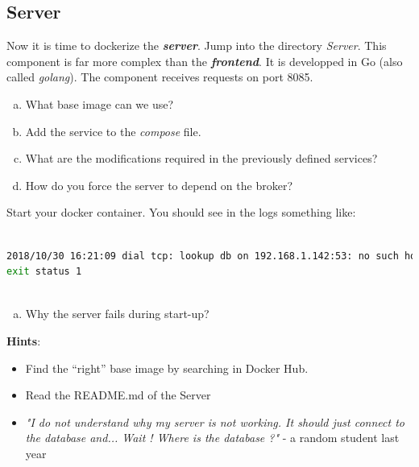 \documentclass[a4paper,11pt]{exam}
\begin{document}
\subsection{Server}
	\begin{questions}

	\question Now it is time to dockerize the \textit{\textbf{server}}. Jump into the directory \textit{Server}. This component is far more complex than the \textit{\textbf{frontend}}. It is developped in Go (also called \textit{golang}). The component receives requests on port 8085.
	
	\begin{enumerate}[(a)] %
		\item What base image can we use?
		\item Add the service to the \textit{compose} file.
		\item What are the modifications required in the previously defined services?
		\item How do you force the server to depend on the broker?
	\end{enumerate}
	Start your docker container. You should see in the logs something like: 
	\begin{lstlisting}[frame=single,language={sh}]  % Start your code-block
	
2018/10/30 16:21:09 dial tcp: lookup db on 192.168.1.142:53: no such host
exit status 1
		
	\end{lstlisting}
	\begin{enumerate}[(e)]
		\item Why the server fails during start-up?
	\end{enumerate}
	
	\textbf{Hints}:
	\begin{itemize}
		\item Find the ``right'' base image by searching in Docker Hub.
		\item Read the README.md of the Server
		\item \textit{"I do not understand why my server is not working. It should just connect to the database and... Wait ! Where is the database ?"} - a random student last year
	\end{itemize}
	\end{questions}
\end{document}

